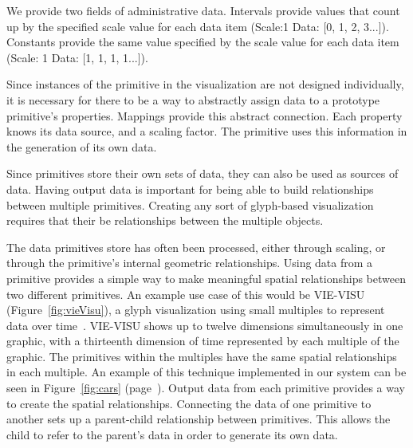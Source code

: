 We provide two fields of administrative data.
Intervals provide values that count up by the specified scale value for each data item (Scale:1 Data: [0, 1, 2, 3...]).
Constants provide the same value specified by the scale value for each data item (Scale: 1 Data: [1, 1, 1, 1...]).

\label{mappings}

Since instances of the primitive in the visualization are not designed individually, it is necessary for there to be a way to abstractly assign data to a prototype primitive's properties.
Mappings provide this abstract connection.
Each property knows its data source, and a scaling factor.
The primitive uses this information in the generation of its own data.

\label{connections}

Since primitives store their own sets of data, they can also be used as sources of data.
Having output data is important for being able to build relationships between multiple primitives.
Creating any sort of glyph-based visualization requires that their be relationships between the multiple objects.

The data primitives store has often been processed, either through scaling, or through the primitive's internal geometric relationships.
Using data from a primitive provides a simple way to make meaningful spatial relationships between two different primitives.
An example use case of this would be VIE-VISU (Figure~\ref{fig:vieVisu}), a glyph visualization using small multiples to represent data over time~\cite{Horn1998}.
VIE-VISU shows up to twelve dimensions simultaneously in one graphic, with a thirteenth dimension of time represented by each multiple of the graphic.
The primitives within the multiples have the same spatial relationships in each multiple.
An example of this technique implemented in our system can be seen in Figure~\ref{fig:cars} (page~\pageref{fig:cars}).
Output data from each primitive provides a way to create the spatial relationships.
Connecting the data of one primitive to another sets up a parent-child relationship between primitives.
This allows the child to refer to the parent's data in order to generate its own data.

